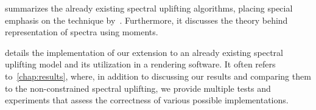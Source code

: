  summarizes the already existing spectral uplifting algorithms, placing special emphasis on the technique by~\citet{upsamplingJakobHanika}. Furthermore, it discusses the theory behind representation of spectra using moments.

 details the implementation of our extension to an already existing spectral uplifting model and its utilization in a rendering software. It often refers to~\cref{chap:results}, where, in addition to discussing our results and comparing them to the non-constrained spectral uplifting, we provide multiple tests and experiments that assess the correctness of various possible implementations.